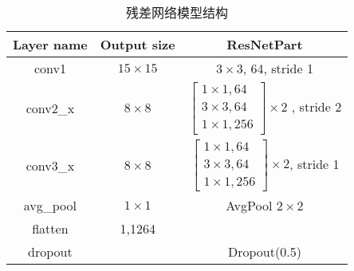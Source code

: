 \begin{table}[h]
	\caption{残差网络模型结构}
	\label{tab:resnet_description}
	\centering
	\begin{tabular}{c|c|c}
		\hline
		Layer name                & Output size                              & ResNetPart             \\
		\hline
		conv1                     & $15 \times 15$                           & $3\times3$, 64, stride 1 \\
		\hline
		\multirow{4}{*}{conv2\_x} & \multirow{4}{*}{\centering $8 \times 8$} &
		\multirow{4}{*}{$\left[\begin{array}{c}
						1 \times 1, 64 \\
						3 \times 3, 64 \\
						1 \times 1, 256
					\end{array}\right] \times 2$ , stride 2}                  \\
		                          &                                          &                          \\
		                          &                                          &                          \\
		                          &                                          &                          \\
		\hline
		\multirow{4}{*}{conv3\_x} & \multirow{4}{*}{\centering $8 \times 8$} &
		\multirow{4}{*}{$\left[\begin{array}{c}
						1 \times 1, 64 \\
						3 \times 3, 64 \\
						1 \times 1, 256
					\end{array}\right] \times 2$, stride 1}                   \\
		                          &                                          &                          \\
		                          &                                          &                          \\
		                          &                                          &                          \\
		\hline
		avg\_pool                 & $1 \times 1$                             & AvgPool $2 \times 2$     \\
		\hline
		flatten                   & 1,1264                                   &                          \\
		\hline
		dropout                   &                                          & Dropout(0.5)             \\
		\hline
	\end{tabular}
\end{table}


